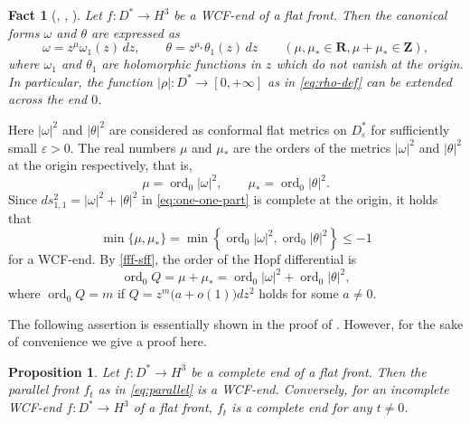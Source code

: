 \documentclass[a4paper]{amsart}
\theoremstyle{plain}
\newtheorem{proposition}[theorem]{Proposition}
\newtheorem{fact}[theorem]{Fact}
\theoremstyle{remark}
\numberwithin{equation}{section}
\begin{document}
\begin{fact}[{\cite{GMM}, \cite{KUY2}, \cite[Proposition 3.2]{KRUY}}]\label{fact:finite}
 Let $f\colon{}D^* \to H^3$ be 
 a WCF-end of a flat front. 
 Then the canonical forms $\omega$ and $\theta$ are expressed as 
 \[
     \omega = z^{\mu} \omega_1(z)\,dz,\qquad
     \theta = z^{\mu_*} \theta_1(z)\,dz
     \qquad (\mu,\mu_*\in{\boldsymbol{R}}, \mu+\mu_*\in{\boldsymbol{Z}}),
 \]
 where
 $\omega_1$ and $\theta_1$ are holomorphic functions in $z$
 which do not vanish at the origin.
 In particular,
 the function $|\rho|\colon{}D^*\to [0,+\infty]$ as in \eqref{eq:rho-def}
 can be extended  across the end\/ $0$.
\end{fact}
Here $|\omega|^2$ and $|\theta|^2$ are considered as conformal 
flat metrics
on $D^*_\varepsilon$ for sufficiently small $\varepsilon>0$.
The real numbers $\mu$ and $\mu_*$ are the orders of the metrics
$|\omega|^2$ and $|\theta|^2$ at the origin respectively, that is,
\begin{equation}\label{eq:order-canonical}
    \mu={\operatorname{ord}}_0|\omega|^2,\qquad
    \mu_*={\operatorname{ord}}_0|\theta|^2.
\end{equation}
Since $ds^2_{1,1}=|\omega|^2 + |\theta|^2$ 
in \eqref{eq:one-one-part} is complete at the origin,
it holds that 
\begin{equation}\label{eq:WC-order}
    \min \{\mu,\mu_*\}=
    \min\left\{
	  {\operatorname{ord}}_0|\omega|^2,{\operatorname{ord}}_0|\theta|^2
	\right\}\leq -1
\end{equation}
for a WCF-end.  By \eqref{fff-sff},
the order of the Hopf differential is 
\begin{equation}\label{eq:Q-omega-theta}
    {\operatorname{ord}}_0 Q = \mu +\mu_* = {\operatorname{ord}}_0|\omega|^2 + {\operatorname{ord}}_0 |\theta|^2,
\end{equation}
 where 
 ${\operatorname{ord}}_0 Q=m$ if $Q=z^m\bigl(a+o(1)\bigr)dz^2$ holds for 
 some $a\neq 0$.

The following assertion is essentially shown in the proof of 
\cite[Theorem 3.4]{KRUY}. 
However, for the sake of convenience we give a proof here.
\begin{proposition}\label{prop:parallel}
 Let $f\colon{}D^*\to H^3$ be a complete end of a flat front.
 Then the parallel front 
 $f_t$ as in \eqref{eq:parallel} is a WCF-end.  
 Conversely, for an incomplete WCF-end $f\colon{}D^*\to H^3$ 
 of a flat front, $f_t$ is a complete end
 for any $t\ne 0$.
\end{proposition}
\end{document}
